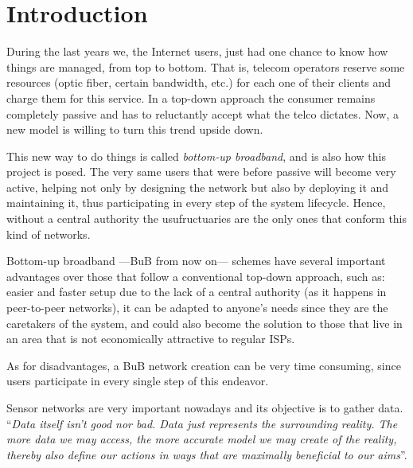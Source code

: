 
\chapter{Introduction} %

\label{Chapter1} %



During the last years we, the Internet users, just had one chance to know how things are managed, from top to bottom. That is, telecom operators reserve some resources (optic fiber, certain bandwidth, etc.) for each one of their clients and charge them for this service. In a top-down approach the consumer remains completely passive and has to reluctantly accept what the telco dictates. Now, a new model is willing to turn this trend upside down.

This new way to do things is called \emph{bottom-up broadband}, and is also how this project is posed. The very same users that were before passive will become very active, helping not only by designing the network but also by deploying it and maintaining it, thus participating in every step of the system lifecycle. Hence, without a central authority the usufructuaries are the only ones that conform this kind of networks.

Bottom-up broadband ---BuB from now on--- schemes have several important advantages over those that follow a conventional top-down approach, such as: easier and faster setup due to the lack of a central authority (as it happens in peer-to-peer networks), it can be adapted to anyone's needs since they are the caretakers of the system, and could also become the solution to those that live in an area that is not economically attractive to regular ISPs\cite{oliver2010wireless}.

As for disadvantages, a BuB network creation can be very time consuming, since users participate in every single step of this endeavor\cite{barcelobottom}. %

Sensor networks are very important nowadays and its objective is to gather data. 
``\emph{Data itself isn't good nor bad. Data just represents the surrounding reality. The more data we may access, the more accurate model we may create of the reality, thereby also define our actions in ways that are maximally beneficial to our aims}''\cite{parazite}.

